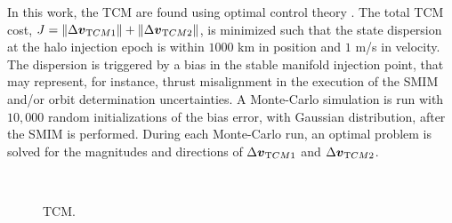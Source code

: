 In this work, the {TCM} are found using optimal control theory \cite{serban2002haloTCM}. The total {TCM} cost, $J = \|\Delta\boldsymbol{v}_{\textrm TCM1}\|+\|\Delta\boldsymbol{v}_{\textrm TCM2}\|$, is minimized such that the state dispersion at the halo injection epoch is within $1000$ km in position and $1$ m/s in velocity. The dispersion is triggered by a bias in the stable manifold injection point, that may represent, for instance, thrust misalignment in the execution of the {SMIM} and/or orbit determination uncertainties. A Monte-Carlo simulation is run with $10,000$ random initializations of the bias error, with Gaussian distribution, after the {SMIM} is performed. During each Monte-Carlo run, an optimal problem is solved for the magnitudes and directions of $\Delta\boldsymbol{v}_{\textrm TCM1}$ and $\Delta\boldsymbol{v}_{\textrm TCM2}$.
%
\begin{figure}[t!]
	\centering
	\hfill
	\hfill
	\hfill
	\hfill
	\hfill \\
	\hfill
	\hfill
	\hfill
	\caption[Trajectory correction maneuvers.]{{TCM}.}
	\label{fig:TCMsData}
\end{figure}
%

